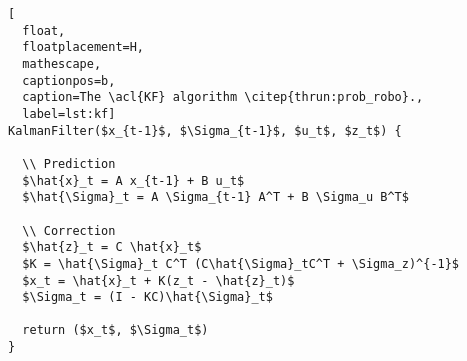 \begin{lstlisting}[
  float,
  floatplacement=H,
  mathescape,
  captionpos=b,
  caption=The \acl{KF} algorithm \citep{thrun:prob_robo}.,
  label=lst:kf]
KalmanFilter($x_{t-1}$, $\Sigma_{t-1}$, $u_t$, $z_t$) {

  \\ Prediction
  $\hat{x}_t = A x_{t-1} + B u_t$
  $\hat{\Sigma}_t = A \Sigma_{t-1} A^T + B \Sigma_u B^T$

  \\ Correction
  $\hat{z}_t = C \hat{x}_t$
  $K = \hat{\Sigma}_t C^T (C\hat{\Sigma}_tC^T + \Sigma_z)^{-1}$
  $x_t = \hat{x}_t + K(z_t - \hat{z}_t)$
  $\Sigma_t = (I - KC)\hat{\Sigma}_t$

  return ($x_t$, $\Sigma_t$)
}
\end{lstlisting}
